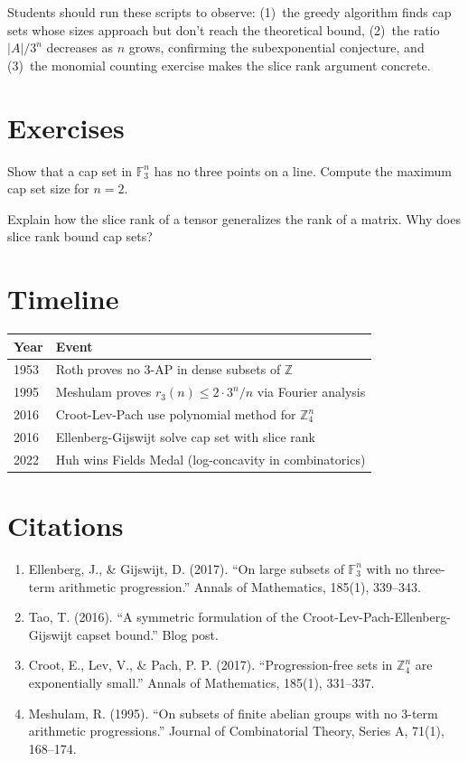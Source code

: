 \begin{highlightbox}
Students should run these scripts to observe: (1)~the greedy algorithm finds cap sets whose sizes approach but don't reach the theoretical bound, (2)~the ratio $|A|/3^n$ decreases as $n$ grows, confirming the subexponential conjecture, and (3)~the monomial counting exercise makes the slice rank argument concrete.
\end{highlightbox}

\section{Exercises}

\begin{exercise}[Basic]
Show that a cap set in $\mathbb{F}_3^n$ has no three points on a line. Compute the maximum cap set size for $n=2$.
\end{exercise}

\begin{exercise}[Intermediate]
Explain how the slice rank of a tensor generalizes the rank of a matrix. Why does slice rank bound cap sets?
\end{exercise}

\section{Timeline}

\begin{tabularx}{\linewidth}{lX}
\toprule
\textbf{Year} & \textbf{Event} \\ \midrule
1953 & Roth proves no 3-AP in dense subsets of $\mathbb{Z}$ \\
1995 & Meshulam proves $r_3(n) \le 2 \cdot 3^n / n$ via Fourier analysis \\
2016 & Croot-Lev-Pach use polynomial method for $\mathbb{Z}_4^n$ \\
2016 & Ellenberg-Gijswijt solve cap set with slice rank \\
2022 & Huh wins Fields Medal (log-concavity in combinatorics) \\
\bottomrule
\end{tabularx}

\section{Citations}

\begin{enumerate}
\item Ellenberg, J., \& Gijswijt, D. (2017). ``On large subsets of $\mathbb{F}_3^n$ with no three-term arithmetic progression.'' Annals of Mathematics, 185(1), 339--343.
\item Tao, T. (2016). ``A symmetric formulation of the Croot-Lev-Pach-Ellenberg-Gijswijt capset bound.'' Blog post.
\item Croot, E., Lev, V., \& Pach, P. P. (2017). ``Progression-free sets in $\mathbb{Z}_4^n$ are exponentially small.'' Annals of Mathematics, 185(1), 331--337.
\item Meshulam, R. (1995). ``On subsets of finite abelian groups with no 3-term arithmetic progressions.'' Journal of Combinatorial Theory, Series A, 71(1), 168--174.
\end{enumerate}
